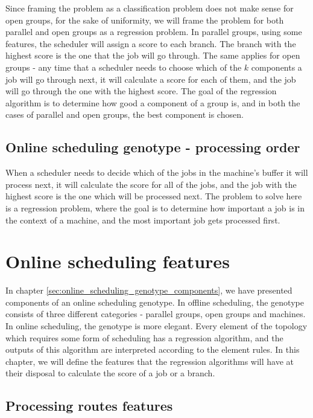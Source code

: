 Since framing the problem as a classification problem does not make sense for open groups, for the sake of uniformity, we will frame the problem for both parallel and open groups as a regression problem. In parallel groups, using some features, the scheduler will assign a score to each branch. The branch with the highest score is the one that the job will go through. The same applies for open groups - any time that a scheduler needs to choose which of the $k$ components a job will go through next, it will calculate a score for each of them, and the job will go through the one with the highest score. The goal of the regression algorithm is to determine how good a component of a group is, and in both the cases of parallel and open groups, the best component is chosen.

\subsection{Online scheduling genotype - processing order}

When a scheduler needs to decide which of the jobs in the machine's buffer it will process next, it will calculate the score for all of the jobs, and the job with the highest score is the one which will be processed next. The problem to solve here is a regression problem, where the goal is to determine how important a job is in the context of a machine, and the most important job gets processed first.

\section{Online scheduling features}
\label{sec:online_scheduling_features}

In chapter \ref{sec:online_scheduling_genotype_components}, we have presented components of an online scheduling genotype. In offline scheduling, the genotype consists of three different categories - parallel groups, open groups and machines. In online scheduling, the genotype is more elegant. Every element of the topology which requires some form of scheduling has a regression algorithm, and the outputs of this algorithm are interpreted according to the element rules. In this chapter, we will define the features that the regression algorithms will have at their disposal to calculate the score of a job or a branch.

\subsection{Processing routes features}

